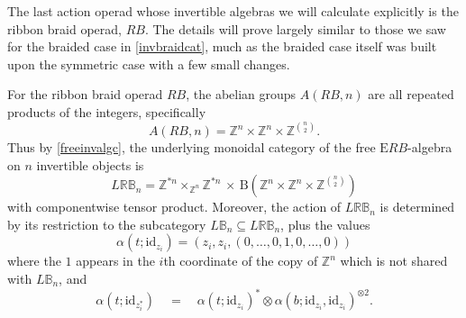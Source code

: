 \documentclass{amsbook} %
\newcommand{\id}{\textrm{id}}
\numberwithin{section}{chapter}
\begin{document}
The last action operad whose invertible algebras we will calculate explicitly is the ribbon braid operad, $RB$. The details will prove largely similar to those we saw for the braided case in \cref{invbraidcat}, much as the braided case itself was built upon the symmetric case with a few small changes. 

\begin{prop} \label{invribboncat} For the ribbon braid operad $RB$, the abelian groups $A(RB,n)$ are all repeated products of the integers, specifically
  \[
    A(RB,n) = \mathbb{Z}^{n} \times \mathbb{Z}^{n} \times \mathbb{Z}^{\binom{n}{2}}.
  \]
Thus by \cref{freeinvalgc}, the underlying monoidal category of the free $\mathrm{E}RB$-algebra on $n$ invertible objects is
  \[
    L\mathbb{RB}_n = \mathbb{Z}^{\ast n} \times_{\mathbb{Z}^n} \mathbb{Z}^{\ast n}  \, \times \, \mathrm{B}\left(\mathbb{Z}^{n} \times \mathbb{Z}^{n} \times \mathbb{Z}^{\binom{n}{2}}\right)
  \]
with componentwise tensor product. Moreover, the action of $L\mathbb{RB}_n$ is determined by its restriction to the subcategory $L\mathbb{B}_n \subseteq L\mathbb{RB}_n$, plus the values
  \[
    \alpha(t; \id_{z_i}) = \left(z_i, z_i, (0,\ldots,0, 1, 0,\ldots,0) \right)
  \]
where the $1$ appears in the $i$th coordinate of the copy of $\mathbb{Z}^{n}$ which is not shared with $L\mathbb{B}_n$, and
  \[
    \alpha(t ;\id_{z_i^*} ) \quad = \quad \alpha(t ; \id_{z_i} )^* \otimes \alpha( b ; \id_{z_i}, \id_{z_i})^{\otimes 2}.
  \]
\end{prop}
\end{document}

